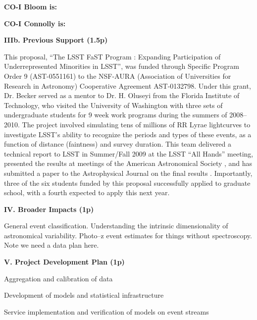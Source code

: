  \smallskip

{\bf CO-I Bloom is:}

 \smallskip

{\bf CO-I Connolly is:}

\bigskip \centerline{\bf IIIb. Previous Support (1.5p)} \smallskip

\smallskip

This proposal, ``The LSST FaST Program : Expanding Participation of
Underrepresented Minorities in LSST'', was funded through Specific Program Order
9 (AST-0551161) to the NSF-AURA (Association of Universities for Research in
Astronomy) Cooperative Agreement AST-0132798.  Under this grant, Dr. Becker
served as a mentor to Dr. H. Oluseyi from the Florida Institute of Technology,
who visited the University of Washington with three sets of undergraduate
students for 9 week work programs during the summers of 2008--2010.  The project
involved simulating tens of millions of RR Lyrae lightcurves to investigate
LSST's ability to recognize the periods and types of these events, as a function
of distance (faintness) and survey duration.  This team delivered a technical
report to LSST in Summer/Fall 2009 at the LSST ``All Hands'' meeting, presented
the results at meetings of the American Astronomical Society
\citep{2011AAS...21725213O,2010AAS...21540118O,2009AAS...21346014O}, and has
submitted a paper to the Astrophysical Journal on the final results
\citep{RRLyrae}.  Importantly, three of the six students funded by this proposal
successfully applied to graduate school, with a fourth expected to apply this
next year.

 \smallskip

 \smallskip

\bigskip \centerline{\bf IV. Broader Impacts (1p)} \smallskip {}

General event classification.  Understanding the intrinsic dimensionality of
astronomical variability. Photo--z event estimates for things without
spectroscopy.  Note we need a data plan here.

\bigskip \centerline{\bf V. Project Development Plan (1p)} \smallskip

 \smallskip

Aggregation and calibration of data

 \smallskip

Development of models and statistical infrastructure

 \smallskip

Service implementation and verification of models on event streams

